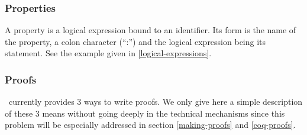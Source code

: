 \subsubsection{Properties}
A property is  a logical expression bound to an identifier. Its
form is the name of the property, a colon character (``:'') and the
logical expression being its statement. See the example given in
\ref{logical-expressions}.
\begin{syn}
 \is
    \tok{:} 
\end{syn}





\subsubsection{Proofs}
\label{proof-short-intro}
\focal\ currently provides 3 ways to write proofs. We only give here a
simple description of these 3 means without going deeply in the
technical mechanisms since this problem will be especially addressed
in section \ref{making-proofs} and \ref{coq-proofs}. %


